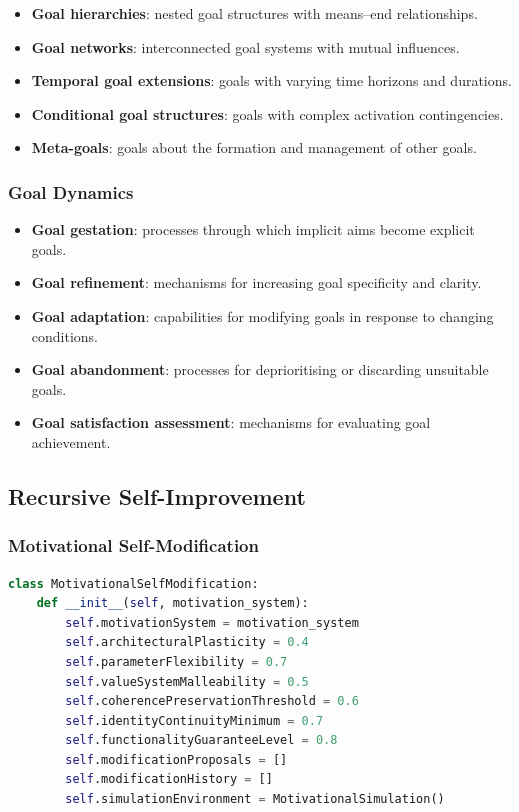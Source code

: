 \documentclass[12pt]{article}
\begin{document}
\begin{itemize}
\item \textbf{Goal hierarchies}: nested goal structures with means--end relationships.
\item \textbf{Goal networks}: interconnected goal systems with mutual influences.
\item \textbf{Temporal goal extensions}: goals with varying time horizons and durations.
\item \textbf{Conditional goal structures}: goals with complex activation contingencies.
\item \textbf{Meta-goals}: goals about the formation and management of other goals.
\end{itemize}

\subsubsection{Goal Dynamics}

\begin{itemize}
\item \textbf{Goal gestation}: processes through which implicit aims become explicit goals.
\item \textbf{Goal refinement}: mechanisms for increasing goal specificity and clarity.
\item \textbf{Goal adaptation}: capabilities for modifying goals in response to changing conditions.
\item \textbf{Goal abandonment}: processes for deprioritising or discarding unsuitable goals.
\item \textbf{Goal satisfaction assessment}: mechanisms for evaluating goal achievement.
\end{itemize}

\subsection{Recursive Self-Improvement}

\subsubsection{Motivational Self-Modification}

\begin{lstlisting}[language=Python]
class MotivationalSelfModification:
    def __init__(self, motivation_system):
        self.motivationSystem = motivation_system
        self.architecturalPlasticity = 0.4
        self.parameterFlexibility = 0.7
        self.valueSystemMalleability = 0.5
        self.coherencePreservationThreshold = 0.6
        self.identityContinuityMinimum = 0.7
        self.functionalityGuaranteeLevel = 0.8
        self.modificationProposals = []
        self.modificationHistory = []
        self.simulationEnvironment = MotivationalSimulation()
\end{lstlisting}
\end{document}
